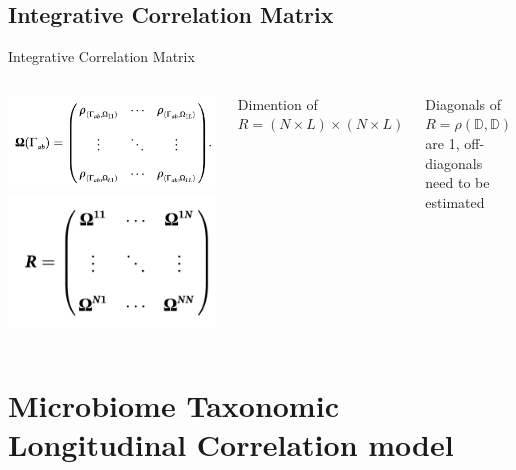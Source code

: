 \documentclass{beamer}
\begin{document}
\subsection{Integrative Correlation Matrix}
\begin{frame}[t]{Integrative Correlation Matrix }
  \begin{columns}[c] %

  \includegraphics[width = \textwidth]{omega_gamma.png}
  \includegraphics[width = \textwidth]{R.png}

Dimention of $R = (N \times L) \times (N \times L)$

Diagonals of $R = \rho(\mathbb{D},\mathbb{D})$ are 1, off-diagonals need to be estimated

  \end{columns}
\end{frame}


\section{Microbiome Taxonomic Longitudinal Correlation model}
\end{document}
